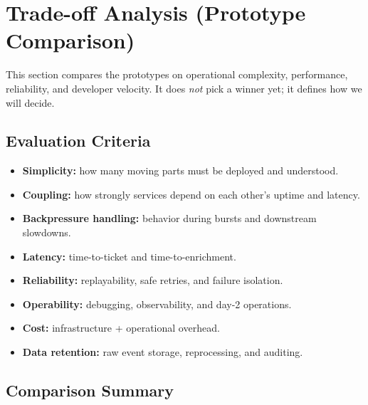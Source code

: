 \section{Trade-off Analysis (Prototype Comparison)}

This section compares the prototypes on operational complexity, performance, reliability, and developer velocity.
It does \emph{not} pick a winner yet; it defines how we will decide.

\subsection{Evaluation Criteria}
\begin{itemize}
  \item \textbf{Simplicity:} how many moving parts must be deployed and understood.
  \item \textbf{Coupling:} how strongly services depend on each other's uptime and latency.
  \item \textbf{Backpressure handling:} behavior during bursts and downstream slowdowns.
  \item \textbf{Latency:} time-to-ticket and time-to-enrichment.
  \item \textbf{Reliability:} replayability, safe retries, and failure isolation.
  \item \textbf{Operability:} debugging, observability, and day-2 operations.
  \item \textbf{Cost:} infrastructure + operational overhead.
  \item \textbf{Data retention:} raw event storage, reprocessing, and auditing.
\end{itemize}

\subsection{Comparison Summary}

